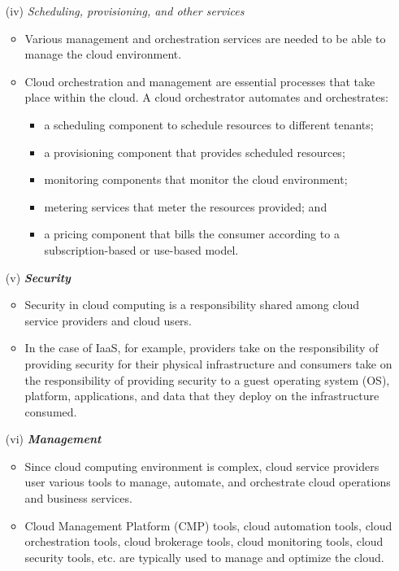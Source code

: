 \documentclass[a4paper, 12pt]{article}
\begin{document}
\begin{itemize}
\item[(iv)]
\textit{Scheduling, provisioning, and other services}
\begin{itemize}
\item
Various management and orchestration services are needed to be able to manage the cloud environment.
\item
Cloud orchestration and management are essential processes that take place within the cloud. A cloud orchestrator automates and orchestrates:
\begin{itemize}
\item
a scheduling component to schedule resources to different tenants;
\item
a provisioning component that provides scheduled resources;
\item
monitoring components that monitor the cloud environment;
\item
metering services that meter the resources provided; and
\item
a pricing component that bills the consumer according to a subscription-based or use-based model.
\end{itemize}
\end{itemize}

\item[(v)]
\textbf{\textit{Security}}
\begin{itemize}
\item
Security in cloud computing is a responsibility shared among cloud service providers and cloud users.
\item
In the case of IaaS, for example, providers take on the responsibility of providing security for their physical infrastructure and consumers take on the responsibility of providing security to a guest operating system (OS), platform, applications, and data that they deploy on the infrastructure consumed.
\end{itemize}

\item[(vi)]
\textbf{\textit{Management}}
\begin{itemize}
\item
Since cloud computing environment is complex, cloud service providers user various tools to manage, automate, and orchestrate cloud operations and business services.
\item
Cloud Management Platform (CMP) tools, cloud automation tools, cloud orchestration tools, cloud brokerage tools, cloud monitoring tools, cloud security tools, etc. are typically used to manage and optimize the cloud.
\end{itemize}

\end{itemize}
\end{document}
